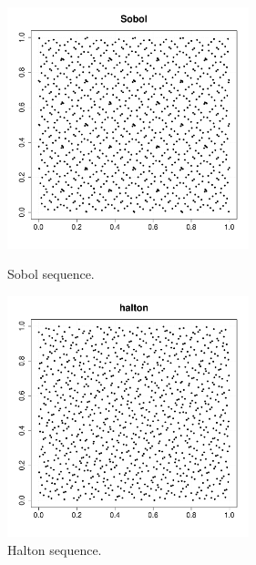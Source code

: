 \begin{figure}[H]
  \begin{minipage}{10cm}
    \begin{center}
      \includegraphics[width=7cm]{sobol_cloud.pdf}
      \caption{Sobol sequence.}
      \label{Sobol}
    \end{center}
  \end{minipage}
  \hfill
  \begin{minipage}{10cm}
    \begin{center}
      \includegraphics[width=7cm]{halton_cloud.pdf}
      \caption{Halton sequence.}
      \label{Halton}
    \end{center}
  \end{minipage}
\end{figure}


